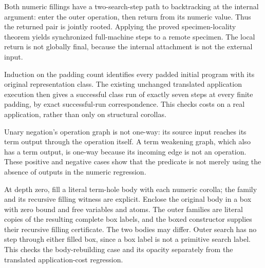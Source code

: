 


Both numeric fillings have a two-search-step path to backtracking at
the internal argument: enter the outer operation, then return from its
numeric value. Thus the returned pair is jointly rooted. Applying the
proved specimen-locality theorem yields synchronized full-machine steps
to a remote specimen. The local return is not globally final, because the
internal attachment is not the external input.




Induction on the padding count identifies every padded initial program
with its original representation class. The existing unchanged translated
application execution then gives a successful class run of exactly seven
steps at every finite padding, by exact successful-run correspondence.
This checks costs on a real application, rather than only on structural
corollas.



Unary negation's operation graph is not one-way: its source input reaches
its term output through the operation itself. A term weakening graph, which
also has a term output, is one-way because its incoming edge is not an
operation. These positive and negative cases show that the predicate is
not merely using the absence of outputs in the numeric regression.



At depth zero, fill a literal term-hole body with each numeric corolla;
the family and its recursive filling witness are explicit. Enclose the
original body in a box with zero bound and free variables and atoms. The
outer families are literal copies of the resulting complete box labels,
and the boxed constructor supplies their recursive filling certificate.
The two bodies may differ. Outer search has no step through either filled
box, since a box label is not a primitive search label. This checks the
body-rebuilding case and its opacity separately from the translated
application-cost regression.

